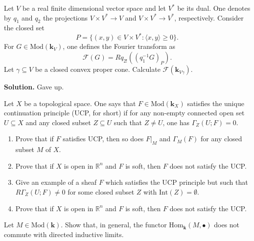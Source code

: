 \documentclass{category-template}
\begin{document}
\begin{problem}
    Let $V$ be a real finite dimensional vector space and let $V^*$ be 
    its dual. One denotes by $q_1$ and $q_2$ the projections 
    $V \times V^* \to V$ and $V \times V^* \to V^*$, respectively.
    Consider the closed set
    \begin{equation*}
        P = \{(x,y) \in V \times V^*: \langle x, y \rangle \geq 0\}.
    \end{equation*}
    For $G \in \text{Mod}(\mathbf{k}_V)$, one defines the Fourier 
    transform as
    \begin{equation*}
        \mathcal{F}(G) = Rq_{2!}((q_1^{-1}G)_P).
    \end{equation*}
    Let $\gamma \subseteq V$ be a closed convex proper cone. Calculate
    $\mathcal{F}(\mathbf{k}_{V\gamma})$. 
\end{problem}

\textbf{Solution.} Gave up.

\begin{problem}
    Let $X$ be a topological space. One says that $F \in \text{Mod}(\mathbf{k}_X)$
    satisfies the unique continuation principle (UCP, for short) if for 
    any non-empty connected open set $U \subseteq X$ and any closed subset 
    $Z \subseteq U$ such that $Z \neq U$, one has $\Gamma_Z(U; F) = 0$.
    \begin{enumerate}
        \item[(i)] Prove that if $F$ satisfies UCP, then so does $F|_M$ and 
        $\Gamma_M(F)$ for any closed subset $M$ of $X$.
        \item[(ii)] Prove that if $X$ is open in $\mathbb{R}^n$ and $F$ is 
        soft, then $F$ does not satisfy the UCP.
        \item[(iii)] Give an example of a sheaf $F$ which satisfies the UCP principle
        but such that $R\Gamma_Z(U;F) \neq 0$ for some closed subset $Z$ with 
        $\text{Int}(Z) = \emptyset$.
        \item[(iv)] Prove that if $X$ is open in $\mathbb{R}^n$ and $F$ is soft,
        then $F$ does not satisfy the UCP.
    \end{enumerate}
\end{problem}

\begin{problem}
    Let $M \in \text{Mod}(\mathbf{k})$. Show that, in general, the functor
    $\text{Hom}_{\mathbf{k}}(M,\bullet)$ does not commute with directed
    inductive limits.
\end{problem}
\end{document}
